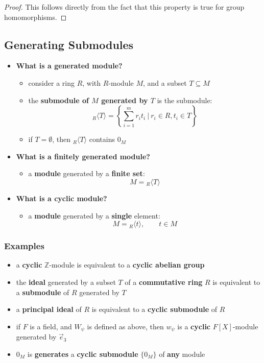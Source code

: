 \documentclass{exam}
\begin{document}
\begin{proof}
This follows directly from the fact that this property is true for group homomorphisms.
\end{proof}

\subsection{Generating Submodules}

\begin{itemize}
    \item \textbf{What is a generated module?}
    \begin{itemize}
        \item consider a ring $R$, with $R$-module $M$, and a subset $T \subseteq M$
        \item the \textbf{submodule of $M$ generated by $T$} is the submodule:
        \[
        {}_R\langle T\rangle = \left\{\sum_{i = 1}^m r_it_i \ | \ r_i \in R, t_i \in T\right\}
        \]
        \item if $T = \emptyset$, then ${}_R\langle T\rangle$ contains $0_M$
    \end{itemize}
    \item \textbf{What is a finitely generated module?}
    \begin{itemize}
        \item a \textbf{module} generated by a \textbf{finite set}:
        \[
        M = {}_R\langle T\rangle
        \]
    \end{itemize}
    \item \textbf{What is a cyclic module?}
    \begin{itemize}
        \item a \textbf{module} generated by a \textbf{single} element:
        \[
        M = {}_R\langle t\rangle, \qquad t \in M
        \]
    \end{itemize}
\end{itemize}

\subsubsection{Examples}

\begin{itemize}
    \item a \textbf{cyclic} $\mathbb{Z}$-module is equivalent to a \textbf{cyclic abelian group}
    \item the \textbf{ideal} generated by a subset $T$ of a \textbf{commutative ring} $R$ is equivalent to a \textbf{submodule} of $R$ generated by $T$
    \item a \textbf{principal ideal} of $R$ is equivalent to a \textbf{cyclic submodule} of $R$
    \item if $F$ is a field, and $W_\psi$ is defined as above, then $w_\psi$ is a \textbf{cyclic} $F[X]$-module generated by $\vec{e}_3$
    \item $0_M$ is \textbf{generates} a \textbf{cyclic submodule} $\{0_M\}$ of \textbf{any} module
\end{itemize}
\end{document}
